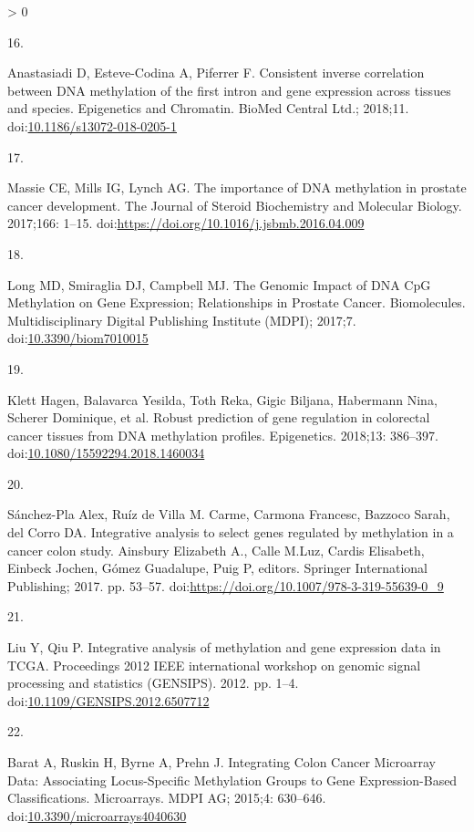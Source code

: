 \documentclass[10pt,letterpaper]{article}
\newlength{\csllabelwidth}
\newlength{\cslhangindent}
\newenvironment{CSLReferences}[2] %
 {%
  \setlength{\parindent}{0pt}
  \ifodd #1 \everypar{\setlength{\hangindent}{\cslhangindent}}\ignorespaces\fi
  \ifnum #2 > 0
  \setlength{\parskip}{#2\baselineskip}
  \fi
 }%
 {}
\newcommand{\CSLLeftMargin}[1]{\parbox[t]{\csllabelwidth}{#1}}
\newcommand{\CSLRightInline}[1]{\parbox[t]{\linewidth - \csllabelwidth}{#1}\break}
\begin{document}
\begin{CSLReferences}{0}{0}
\leavevmode\hypertarget{ref-Anastasiadi2018}{}%
\CSLLeftMargin{16. }
\CSLRightInline{Anastasiadi D, Esteve-Codina A, Piferrer F. {Consistent
inverse correlation between DNA methylation of the first intron and gene
expression across tissues and species}. Epigenetics and Chromatin.
BioMed Central Ltd.; 2018;11.
doi:\href{https://doi.org/10.1186/s13072-018-0205-1}{10.1186/s13072-018-0205-1}}

\leavevmode\hypertarget{ref-Massie2017}{}%
\CSLLeftMargin{17. }
\CSLRightInline{Massie CE, Mills IG, Lynch AG. The importance of DNA
methylation in prostate cancer development. The Journal of Steroid
Biochemistry and Molecular Biology. 2017;166: 1--15.
doi:\url{https://doi.org/10.1016/j.jsbmb.2016.04.009}}

\leavevmode\hypertarget{ref-Long2017}{}%
\CSLLeftMargin{18. }
\CSLRightInline{Long MD, Smiraglia DJ, Campbell MJ. {The Genomic Impact
of DNA CpG Methylation on Gene Expression; Relationships in Prostate
Cancer.} Biomolecules. Multidisciplinary Digital Publishing Institute
(MDPI); 2017;7.
doi:\href{https://doi.org/10.3390/biom7010015}{10.3390/biom7010015}}

\leavevmode\hypertarget{ref-Klett2018}{}%
\CSLLeftMargin{19. }
\CSLRightInline{Klett Hagen, Balavarca Yesilda, Toth Reka, Gigic
Biljana, Habermann Nina, Scherer Dominique, et al. Robust prediction of
gene regulation in colorectal cancer tissues from DNA methylation
profiles. Epigenetics. 2018;13: 386--397.
doi:\href{https://doi.org/10.1080/15592294.2018.1460034}{10.1080/15592294.2018.1460034}}

\leavevmode\hypertarget{ref-Sanchez-Pla2017}{}%
\CSLLeftMargin{20. }
\CSLRightInline{Sánchez-Pla Alex, Ruíz de Villa M. Carme, Carmona
Francesc, Bazzoco Sarah, del Corro DA. Integrative analysis to select
genes regulated by methylation in a cancer colon study. Ainsbury
Elizabeth A., Calle M.Luz, Cardis Elisabeth, Einbeck Jochen, Gómez
Guadalupe, Puig P, editors. Springer International Publishing; 2017. pp.
53--57. doi:\url{https://doi.org/10.1007/978-3-319-55639-0_9}}

\leavevmode\hypertarget{ref-Liu2012}{}%
\CSLLeftMargin{21. }
\CSLRightInline{Liu Y, Qiu P. Integrative analysis of methylation and
gene expression data in TCGA. Proceedings 2012 IEEE international
workshop on genomic signal processing and statistics (GENSIPS). 2012.
pp. 1--4.
doi:\href{https://doi.org/10.1109/GENSIPS.2012.6507712}{10.1109/GENSIPS.2012.6507712}}

\leavevmode\hypertarget{ref-Barat2015}{}%
\CSLLeftMargin{22. }
\CSLRightInline{Barat A, Ruskin H, Byrne A, Prehn J. {Integrating Colon
Cancer Microarray Data: Associating Locus-Specific Methylation Groups to
Gene Expression-Based Classifications}. Microarrays. MDPI AG; 2015;4:
630--646.
doi:\href{https://doi.org/10.3390/microarrays4040630}{10.3390/microarrays4040630}}


\end{CSLReferences}
\end{document}
